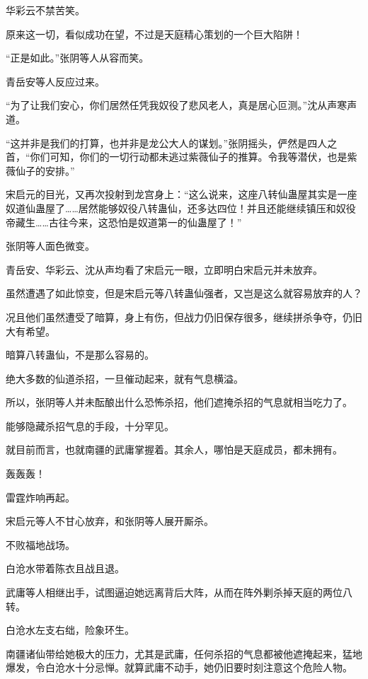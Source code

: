 
\begin{this_body}



华彩云不禁苦笑。

原来这一切，看似成功在望，不过是天庭精心策划的一个巨大陷阱！

“正是如此。”张阴等人从容而笑。

青岳安等人反应过来。

“为了让我们安心，你们居然任凭我奴役了悲风老人，真是居心叵测。”沈从声寒声道。

“这并非是我们的打算，也并非是龙公大人的谋划。”张阴摇头，俨然是四人之首，“你们可知，你们的一切行动都未逃过紫薇仙子的推算。令我等潜伏，也是紫薇仙子的安排。”

宋启元的目光，又再次投射到龙宫身上：“这么说来，这座八转仙蛊屋其实是一座奴道仙蛊屋了……居然能够奴役八转蛊仙，还多达四位！并且还能继续镇压和奴役帝藏生……古往今来，这恐怕是奴道第一的仙蛊屋了！”

张阴等人面色微变。

青岳安、华彩云、沈从声均看了宋启元一眼，立即明白宋启元并未放弃。

虽然遭遇了如此惊变，但是宋启元等八转蛊仙强者，又岂是这么就容易放弃的人？

况且他们虽然遭受了暗算，身上有伤，但战力仍旧保存很多，继续拼杀争夺，仍旧大有希望。

暗算八转蛊仙，不是那么容易的。

绝大多数的仙道杀招，一旦催动起来，就有气息横溢。

所以，张阴等人并未酝酿出什么恐怖杀招，他们遮掩杀招的气息就相当吃力了。

能够隐藏杀招气息的手段，十分罕见。

就目前而言，也就南疆的武庸掌握着。其余人，哪怕是天庭成员，都未拥有。

轰轰轰！

雷霆炸响再起。

宋启元等人不甘心放弃，和张阴等人展开厮杀。

不败福地战场。

白沧水带着陈衣且战且退。

武庸等人相继出手，试图逼迫她远离背后大阵，从而在阵外剿杀掉天庭的两位八转。

白沧水左支右绌，险象环生。

南疆诸仙带给她极大的压力，尤其是武庸，任何杀招的气息都被他遮掩起来，猛地爆发，令白沧水十分忌惮。就算武庸不动手，她仍旧要时刻注意这个危险人物。


\end{this_body}
